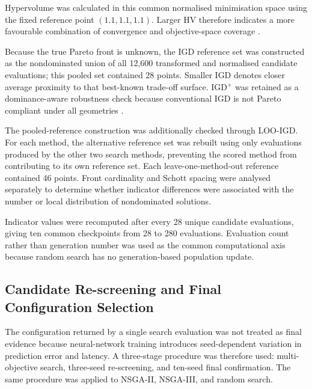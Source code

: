 \documentclass[a4paper,fleqn]{cas-sc}
\begin{document}
Hypervolume was calculated in this common normalised minimisation space using the fixed reference point $(1.1,1.1,1.1)$. Larger HV therefore indicates a more favourable combination of convergence and objective-space coverage \cite{zitzler2003performance}.

Because the true Pareto front is unknown, the IGD reference set was constructed as the nondominated union of all 12,600 transformed and normalised candidate evaluations; this pooled set contained 28 points. Smaller IGD denotes closer average proximity to that best-known trade-off surface. IGD$^{+}$ was retained as a dominance-aware robustness check because conventional IGD is not Pareto compliant under all geometries \cite{ishibuchi2019indicators}.

The pooled-reference construction was additionally checked through LOO-IGD. For each method, the alternative reference set was rebuilt using only evaluations produced by the other two search methods, preventing the scored method from contributing to its own reference set. Each leave-one-method-out reference contained 46 points. Front cardinality and Schott spacing were analysed separately to determine whether indicator differences were associated with the number or local distribution of nondominated solutions.

Indicator values were recomputed after every 28 unique candidate evaluations, giving ten common checkpoints from 28 to 280 evaluations. Evaluation count rather than generation number was used as the common computational axis because random search has no generation-based population update.


\subsection{Candidate Re-screening and Final Configuration Selection}
\label{sec:final_selection}

The configuration returned by a single search evaluation was not treated as final evidence because neural-network training introduces seed-dependent variation in prediction error and latency. A three-stage procedure was therefore used: multi-objective search, three-seed re-screening, and ten-seed final confirmation. The same procedure was applied to NSGA-II, NSGA-III, and random search.
\end{document}
